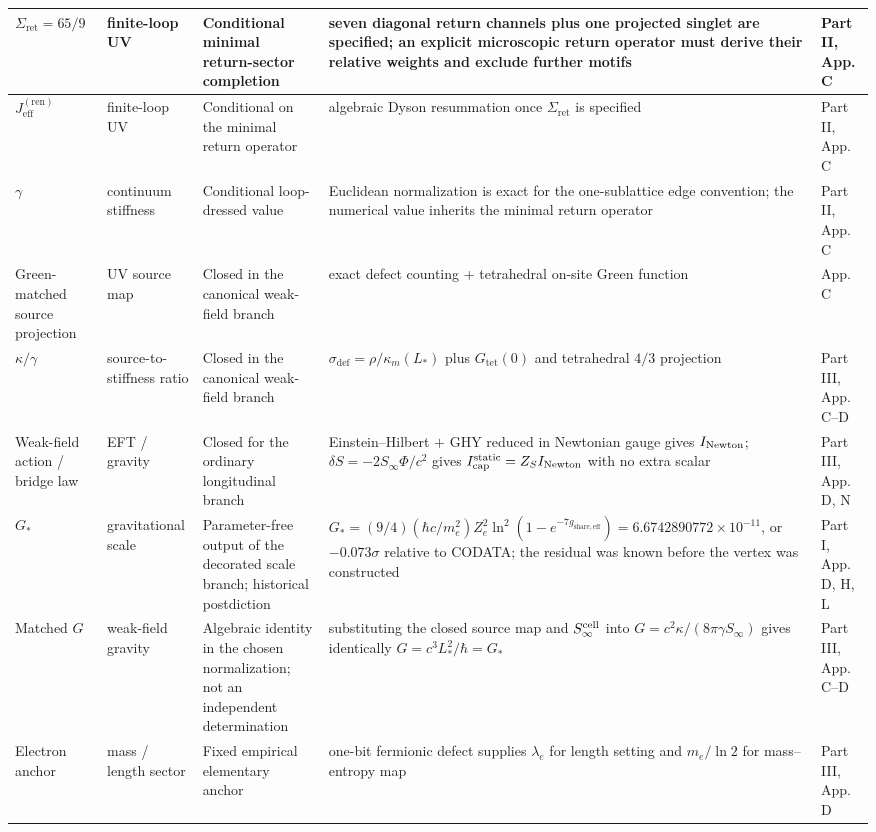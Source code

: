 \documentclass[11pt]{article}
\begin{document}
\begin{longtable}{|L{0.18\textwidth}|L{0.13\textwidth}|L{0.16\textwidth}|L{0.33\textwidth}|L{0.13\textwidth}|}
\hline
$\Sigma_{\mathrm{ret}}=65/9$ & finite-loop UV & Conditional minimal return-sector completion & seven diagonal return channels plus one projected singlet are specified; an explicit microscopic return operator must derive their relative weights and exclude further motifs & Part II, App. C \\
\hline
$J_{\mathrm{eff}}^{(\mathrm{ren})}$ & finite-loop UV & Conditional on the minimal return operator & algebraic Dyson resummation once $\Sigma_{\mathrm{ret}}$ is specified & Part II, App. C \\
\hline
$\gamma$ & continuum stiffness & Conditional loop-dressed value & Euclidean normalization is exact for the one-sublattice edge convention; the numerical value inherits the minimal return operator & Part II, App. C \\
\hline
Green-matched source projection & UV source map & Closed in the canonical weak-field branch & exact defect counting + tetrahedral on-site Green function & App. C \\
\hline
$\kappa/\gamma$ & source-to-stiffness ratio & Closed in the canonical weak-field branch & $\sigma_{\mathrm{def}}=\rho/\kappa_m(L_*)$ plus $G_{\mathrm{tet}}(0)$ and tetrahedral $4/3$ projection & Part III, App. C--D \\
\hline
Weak-field action / bridge law & EFT / gravity & Closed for the ordinary longitudinal branch & Einstein--Hilbert $+$ GHY reduced in Newtonian gauge gives $I_{\rm Newton}$; $\delta S=-2S_\infty\Phi/c^2$ gives $I_{\rm cap}^{\rm static}=Z_SI_{\rm Newton}$ with no extra scalar & Part III, App. D, N \\
\hline
$G_*$ & gravitational scale & Parameter-free output of the decorated scale branch; historical postdiction & $G_*=(9/4)(\hbar c/m_e^2)Z_e^2\ln^2(1-e^{-7g_{\mathrm{share,eff}}})=6.6742890772\times10^{-11}$, or $-0.073\sigma$ relative to CODATA; the residual was known before the vertex was constructed & Part I, App. D, H, L \\
\hline
Matched $G$ & weak-field gravity & Algebraic identity in the chosen normalization; not an independent determination & substituting the closed source map and $S_\infty^{\rm cell}$ into $G=c^2\kappa/(8\pi\gamma S_\infty)$ gives identically $G=c^3L_*^2/\hbar=G_*$ & Part III, App. C--D \\
\hline
Electron anchor & mass / length sector & Fixed empirical elementary anchor & one-bit fermionic defect supplies $\lambda_e$ for length setting and $m_e/\ln2$ for mass--entropy map & Part III, App. D \\

\end{longtable}
\end{document}
